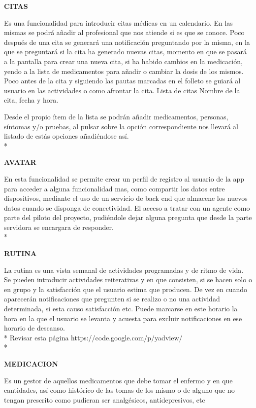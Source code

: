 \documentclass[../pfc.tex]{subfiles}
\begin{document}
	\textbf{CITAS}
	
	Es una funcionalidad para introducir citas médicas en un calendario. En las mismas se podrá añadir al profesional que nos atiende si es que se conoce. 
	Poco después de una cita se generará una notificación preguntando por la misma, en la que se preguntará si la cita ha generado nuevas citas, momento en que se pasará a la pantalla para crear una nueva cita, si ha habido cambios en la medicación, yendo a la lista de medicamentos para añadir o cambiar la dosis de los mismos.
	Poco antes de la cita y siguiendo las pautas marcadas en el folleto se guiará al usuario en las actividades o como afrontar la cita.
	Lista de citas Nombre de la cita, fecha y hora.

	Desde el propio ítem de la lista se podrán añadir medicamentos, personas, síntomas y/o pruebas, al pulsar sobre la opción correspondiente nos llevará al listado de estás opciones añadiéndose así.\\*
	
	\clearpage
	
	\textbf{AVATAR}
	
	En esta funcionalidad se permite crear un perfil de registro al usuario de la app para acceder a alguna funcionalidad mas, como compartir los datos entre dispositivos, mediante el uso de un servicio de back end que almacene los nuevos datos cuando se disponga de conectividad. El acceso a tratar con un agente como parte del piloto del proyecto, pudiéndole dejar alguna pregunta que desde la parte servidora se encargara de responder.\\*

	\textbf{RUTINA}
	
	La rutina es una vista semanal de actividades programadas y de ritmo de vida. Se pueden introducir actividades reiterativas y en que consisten, si se hacen solo o en grupo y la satisfacción que el usuario estima que producen. De vez en cuando aparecerán notificaciones que pregunten si se realizo o no una actividad determinada, si esta causo satisfacción etc. Puede marcarse en este horario la hora en la que el usuario se levanta y acuesta para excluir notificaciones en ese horario de descanso. \\*
	Revisar esta página	https://code.google.com/p/yadview/\\*
		
	
	\textbf{MEDICACION}
	
	Es un gestor de aquellos medicamentos que debe tomar el enfermo y en que cantidades, así como histórico de las tomas de los mismo o de alguno que no tengan prescrito como pudieran ser analgésicos, antidepresivos, etc 
	
\end{document}
